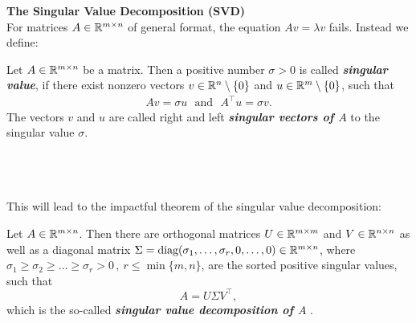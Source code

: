\begin{frame}
\textbf{The Singular Value Decomposition (SVD)}\\
For matrices $A \in {\mathbb{R}}^{m\times n}$ of general format, the equation $Av  = \lambda v$ fails. Instead we define:
\begin{definition}\label{def:singularValVec}
Let $A \in {\mathbb{R}}^{m\times n}$ be a matrix. Then a positive number $\sigma >0$ is called \textit{\textbf{singular value}}, if there exist nonzero vectors $v \in {\mathbb{R}}^{n} \setminus \{0\}$ and $u \in {\mathbb{R}}^{m}\setminus \{0\}$, such that
\begin{align}
Av = \sigma u ~~~\text{and}~~~A^\top u = \sigma v. \label{eq:SVDstart}
\end{align}
The vectors $v$ and $u$ are called right and left \textit{\textbf{singular vectors of $A$}} to the singular value $\sigma$.
\end{definition}
%
~\\
~\\~\\
This will lead to the impactful theorem of the singular value decomposition: \vspace*{-0.3cm}
\begin{theo}\label{theo:SVD-exist} Let $A\in{\mathbb{R}}^{m\times n}$. Then there are orthogonal matrices $U\in{\mathbb{R}}^{m\times m}$ and $V\in{\mathbb{R}}^{n\times n}$ as well as a diagonal matrix $\Sigma = \text{diag}(\sigma_1,\ldots, \sigma_r,0,\ldots,0) \in {\mathbb{R}}^{m\times n}$, where $\sigma_1\ge\sigma_2\ge\ldots\ge\sigma_r> 0\, ,\ r \leq\min\{m,n\}$, are the sorted positive singular values, such that 
	$$A=U \Sigma V^\top,$$
	which is the	so-called \textit{\textbf{singular value decomposition of $A$}} .
\end{theo}
\end{frame}


